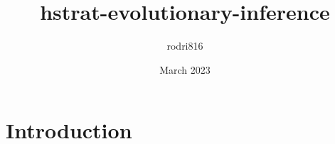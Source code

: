 \documentclass{article}
\title{hstrat-evolutionary-inference}
\author{rodri816 }
\date{March 2023}
\begin{document}
\maketitle

\section{Introduction}
\end{document}
